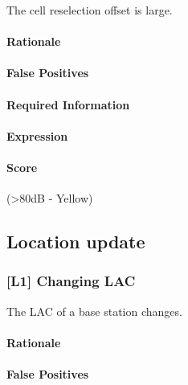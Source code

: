 \documentclass[a4paper,11pt,notitlepage,bigheadings,oneside]{scrartcl}
\begin{document}
The cell reselection offset is large.

\paragraph{Rationale}

\TBD

\paragraph{False Positives}

\TBD

\paragraph{Required Information}

\TBD

\paragraph{Expression}

\TBD

\paragraph{Score}

\TBD{} (\textgreater 80dB - Yellow)


\subsection{Location update}

\subsubsection{[L1] Changing LAC}

The LAC of a base station changes.

\paragraph{Rationale}

\TBD{}

\paragraph{False Positives}
\end{document}
